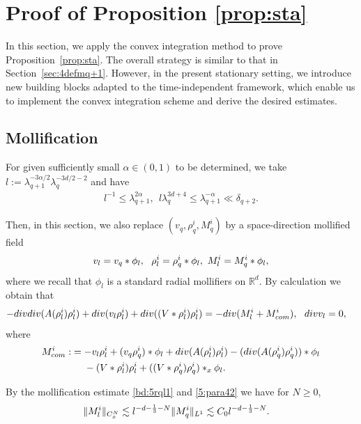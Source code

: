 \documentclass[10pt,a4paper]{amsart}
\numberwithin{equation}{section}
\def\geq{\geqslant}
\def\leq{\leqslant}
\def\div{\mathord{{\rm div}}}
\def\geq{\geqslant}
\def\leq{\leqslant}
\def\div{\mathord{{\rm div}}}
\begin{document}
  


\section{Proof of Proposition \ref{prop:sta}}\label{sec:convexsta}
In this section, we apply the convex integration method to prove Proposition~\ref{prop:sta}. 
The overall strategy is similar to that in Section~\ref{sec:4defmq+1}. 
However, in the present stationary setting, we introduce new building blocks adapted to the time-independent framework, which enable us to implement the convex integration scheme and derive the desired estimates.

\subsection{Mollification}\label{sec:mpll5}
For given sufficiently small $\alpha\in(0,1)$ to be determined, we  take  $ {l}:=\lambda_{q+1}^{-3\alpha/{2}}\lambda_{q}^{-3d/2-2}$ and have 
 \begin{align}
     {l}^{-1}\leq\lambda_{q+1}^{2\alpha},\ \   l\lambda_q^{3d+4} \leq 
     \lambda_{q+1}^{-\alpha}\ll\delta_{q+2}.\label{5:para42}
 \end{align} 

Then,  in this section, we also replace $(v_{q},  \rho^i_{q},M^i_q)$ by a space-direction mollified field  
\begin{align}
v_l=v_{q}*\phi_l,\ \ 
   \rho^i_l=  \rho^i_{q}*\phi_l,\  M^i_l=M^i_{q}* \phi_l,\notag
\end{align}
where we recall that $\phi_l$ is a   standard radial mollifiers on $\mathbb{R}^{d}$.  
By calculation we obtain that 
\begin{align*}
-\div\div (A(\rho^i _l) \rho^i_{l})+\div(v_l   \rho^i_l)+\div((V*\rho_l^i)\rho_l^i)&=-\div (M^i_l+M^i_{com} ),\ \
\div v_l=0,
\end{align*}
where
\begin{align*}
M^i_{com} :&=-v_l   \rho^i_l+(v_{q}   \rho^i_{q})* \phi_l+\div( A(  \rho^i_{l}) \rho^i_{l})-( \div (A(  \rho^i_{q})  \rho^i_{q}))* \phi_l\\
&\ \ \ \   -(V*\rho_l^i)\rho_l^i+((V*\rho_q^i)\rho_q^i)*_x\phi_l.\notag
\end{align*}

By the mollification estimate \eqref{bd:5rql1}
 and \eqref{5:para42}  we have for $N\geq 0$,
\begin{align}
    \|M^i_l \|_{C_{x}^N}&\lesssim l^{-d-\frac13-N} \|M^i_{q } \|_{L^1}\lesssim C_0  l^{-d-\frac13-N}. \notag
 \end{align} 
\end{document}
